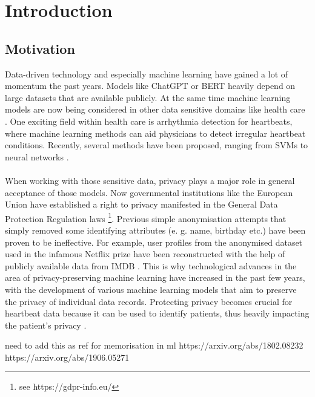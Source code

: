 \section{Introduction}

\subsection{Motivation}

Data-driven technology and especially machine learning have gained a lot of momentum the past years. Models like ChatGPT or BERT heavily depend on large datasets that are available publicly. At the same time machine learning models are now being considered in other data sensitive domains like health care \parencite[see][]{ai_and_med,aimed2,aimed3,aimed4}. One exciting field within health care is arrhythmia detection for heartbeats, where machine learning methods can aid physicians to detect irregular heartbeat conditions. Recently, several methods have been proposed, ranging from SVMs to neural networks \parencite[see review][]{arr_rev}.

\paragraph{}
When working with those sensitive data, privacy plays a major role in general acceptance of those models. Now governmental institutions like the European Union have established a right to privacy manifested in the General Data Protection Regulation laws \footnote[1]{see https://gdpr-info.eu/}. Previous simple anonymisation attempts that simply removed some identifying attributes (e. g. name, birthday etc.) have been proven to be ineffective. For example, user profiles from the anonymised dataset used in the infamous Netflix prize have been reconstructed with the help of publicly available data from IMDB \cite{4531148}. This is why technological advances in the area of privacy-preserving machine learning have increased in the past few years, with the development of various machine learning models that aim to preserve the privacy of individual data records. Protecting privacy becomes crucial for heartbeat data because it can be used to identify patients, thus heavily impacting the patient's privacy \parencite[see heartbeat biometrics][]{heartb_auth,hegde2011heartbeat}.

need to add this as ref for memorisation in ml
https://arxiv.org/abs/1802.08232
https://arxiv.org/abs/1906.05271

